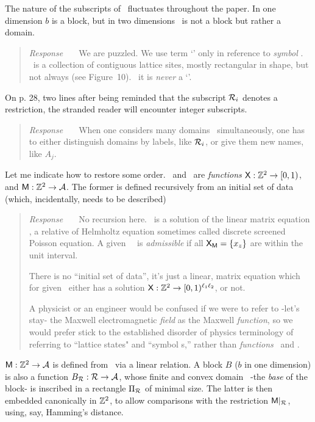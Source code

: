\documentclass[12pt]{iopart}
\begin{document}
\begin{enumerate}
The nature of the subscripts of \Mm\ fluctuates throughout the paper. In
one dimension $b$ is a block, but in two dimensions \R\ is not a block
but rather a domain.
    \begin{quote}
{\em Response~~~}
We are puzzled. We use term `\brick' only in reference to \emph{symbol}
\brick.
\R\ is a collection of contiguous lattice sites, mostly rectangular in
shape, but not always (see Figure~10). \R\ it is \emph{never} a `\brick'.
    \end{quote}
On p. 28, two lines after being reminded that the
subscript $\mathcal{R}_i$ denotes a restriction, the stranded reader will
encounter integer subscripts.
    \begin{quote}
{\em Response~~~}
When one considers many domains \R\ simultaneously, one has to either
distinguish domains by labels, like $\mathcal{R}_i$, or give them new names, like
$A_j$.
    \end{quote}




Let me indicate how to restore some order. \Xx\ and \Mm\ are \emph{functions}
$\mathsf{X} : \mathbb{Z}^{2}\to[0,1)$, and
$\mathsf{M} : \mathbb{Z}^{2}\to\mathcal{A}$.
The former is
defined recursively from an initial set of data (which, incidentally,
needs to be described)

\begin{quote}
{\em Response~~~}
No recursion here. \Xx\ is a solution of the linear matrix equation
,
a relative of Helmholtz equation sometimes called
discrete screened Poisson equation.
A given  \brick\ \Mm\ is \emph{admissible} if all
$\mathsf{X}_{\mathsf{M}}=\{x_{z}\}$ are within the unit interval.

There is no ``initial set of data'', it's just a linear, matrix equation
which for given \Mm\ either has a solution
$\mathsf{X} : \mathbb{Z}^{2}\to[0,1)^{\ell_1\ell_2}$,
or not.

A physicist or an engineer would be confused
if we were to refer to -let's stay-
the Maxwell electromagnetic \emph{field}
as the Maxwell \emph{function}, so we would prefer stick to
the established disorder of physics terminology of referring to ``lattice states"
and ``symbol \brick s,'' rather than \emph{functions}
\Xx\ and \Mm.
\end{quote}

$\mathsf{M} : \mathbb{Z}^{2}\to\mathcal{A}$ is defined from \Xx\ via a linear
relation. A block $B$ ($b$ in one dimension) is also a function $B_{\mathcal{R}} : \mathcal{R}\to\mathcal{A}$,
whose finite and convex domain \R\ -the \emph{base} of the block- is inscribed
in a rectangle $\Pi_{\mathcal{R}}$ of minimal size. The latter is then embedded
canonically in $\mathbb{Z}^{2}$, to allow comparisons with the restriction
$\mathsf{M}|_{\mathcal{R}}$, using, say, Hamming's distance.


\end{enumerate}
\end{document}
